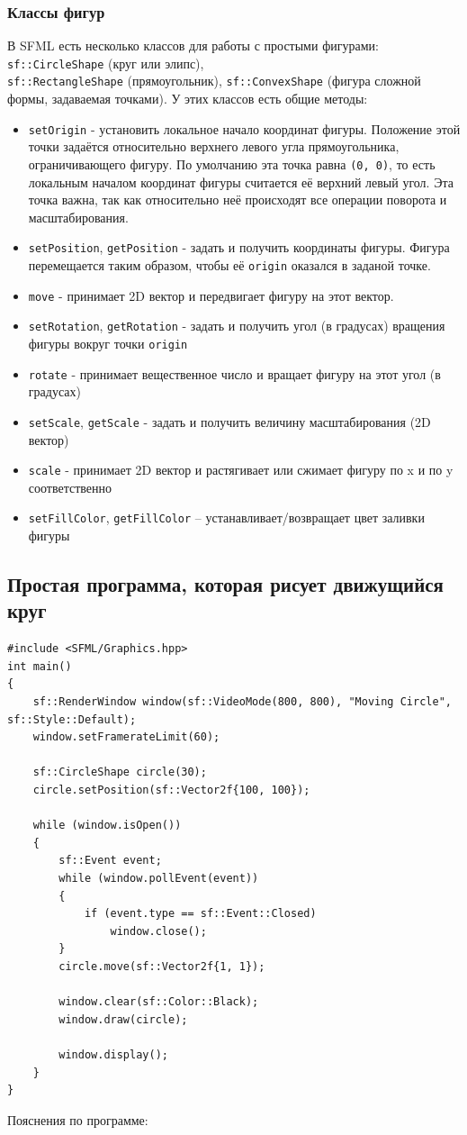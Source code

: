 \documentclass{article}
\begin{document}
\subsubsection*{Классы фигур}
В SFML есть несколько классов для работы с простыми фигурами: \texttt{sf::CircleShape} (круг или элипс),\\ \texttt{sf::RectangleShape} (прямоугольник), \texttt{sf::ConvexShape} (фигура сложной формы, задаваемая точками). У этих классов есть общие методы:
\begin{itemize}
\item \texttt{setOrigin} - установить локальное начало координат фигуры. Положение этой точки задаётся относительно верхнего левого угла прямоугольника, ограничивающего фигуру. По умолчанию эта точка равна \texttt{(0, 0)}, то есть локальным началом координат фигуры считается её верхний левый угол.  Эта точка важна, так как относительно неё происходят все операции поворота и масштабирования.
\item \texttt{setPosition}, \texttt{getPosition} - задать и получить координаты фигуры. Фигура перемещается таким образом, чтобы её \texttt{origin} оказался в заданой точке.
\item \texttt{move} - принимает 2D вектор и передвигает фигуру на этот вектор.
\item \texttt{setRotation}, \texttt{getRotation} - задать и получить угол (в градусах) вращения фигуры вокруг точки \texttt{origin}
\item \texttt{rotate} - принимает вещественное число и вращает фигуру на этот угол (в градусах)
\item \texttt{setScale}, \texttt{getScale} - задать и получить величину масштабирования (2D вектор)
\item \texttt{scale} - принимает  2D вектор и растягивает или сжимает фигуру по x и по y соответственно
\item \texttt{setFillColor}, \texttt{getFillColor} -- устанавливает/возвращает цвет заливки фигуры
\end{itemize}


\subsection*{Простая программа, которая рисует движущийся круг}
\begin{lstlisting}
#include <SFML/Graphics.hpp>
int main()
{
    sf::RenderWindow window(sf::VideoMode(800, 800), "Moving Circle", sf::Style::Default);
    window.setFramerateLimit(60);
    
    sf::CircleShape circle(30);
    circle.setPosition(sf::Vector2f{100, 100});

    while (window.isOpen())
    {
        sf::Event event;
        while (window.pollEvent(event)) 
        {
            if (event.type == sf::Event::Closed)
                window.close();
        }
        circle.move(sf::Vector2f{1, 1});

        window.clear(sf::Color::Black);
        window.draw(circle);

        window.display();
    }
}
\end{lstlisting}
Пояснения по программе:
\end{document}
